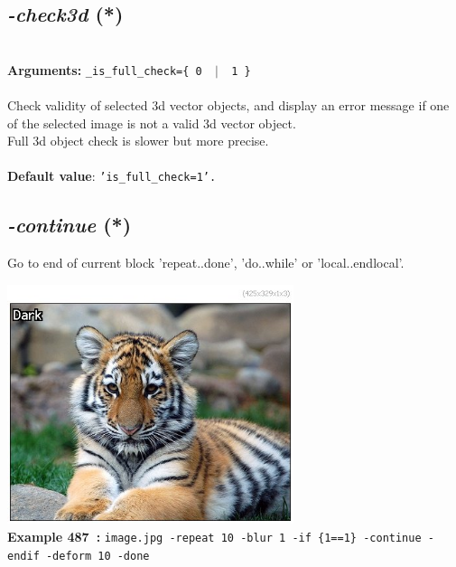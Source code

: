 \documentclass[a4paper,11pt,twoside]{book}
\begin{document}
\subsection{\emph{-check3d} (*)}\vspace*{-0.5em}
~\\\textbf{Arguments: } 
{\small \texttt{\_is\_full\_check=\{ 0 ~$|$~ 1 \}}}\\~\\
Check validity of selected 3d vector objects, and display an error message
if one of the selected image is not a valid 3d vector object.
~\\Full 3d object check is slower but more precise.
~\\~\\\textbf{Default value}: {\small \texttt{'is\_full\_check=1'.}}


\subsection{\emph{-continue} (*)}\vspace*{-0.5em}
Go to end of current block 'repeat..done', 'do..while' or 'local..endlocal'.
\begin{center}\includegraphics[keepaspectratio=true,height=7cm,width=\textwidth]{img/gmic_def487.jpg}\\
{\footnotesize \textbf{Example 487~:} \texttt{image.jpg -repeat 10 -blur 1 -if \{1==1\} -continue -endif -deform 10 -done}}
\end{center}
\end{document}
